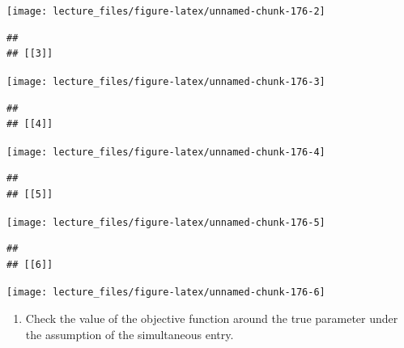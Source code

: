 \documentclass[
]{book}
\providecommand{\tightlist}{%
  \setlength{\itemsep}{0pt}\setlength{\parskip}{0pt}}
\begin{document}
\begin{center}\texttt{[image: lecture\_files/figure-latex/unnamed-chunk-176-2]} \end{center}

\begin{verbatim}
## 
## [[3]]
\end{verbatim}

\begin{center}\texttt{[image: lecture\_files/figure-latex/unnamed-chunk-176-3]} \end{center}

\begin{verbatim}
## 
## [[4]]
\end{verbatim}

\begin{center}\texttt{[image: lecture\_files/figure-latex/unnamed-chunk-176-4]} \end{center}

\begin{verbatim}
## 
## [[5]]
\end{verbatim}

\begin{center}\texttt{[image: lecture\_files/figure-latex/unnamed-chunk-176-5]} \end{center}

\begin{verbatim}
## 
## [[6]]
\end{verbatim}

\begin{center}\texttt{[image: lecture\_files/figure-latex/unnamed-chunk-176-6]} \end{center}

\begin{enumerate}
\def\labelenumi{\arabic{enumi}.}
\setcounter{enumi}{4}
\tightlist
\item
  Check the value of the objective function around the true parameter under the assumption of the simultaneous entry.
\end{enumerate}
\end{document}
